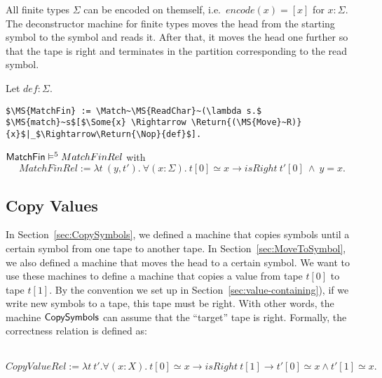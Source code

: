 All finite types $\Sigma$ can be encoded on themself, i.e.\ $encode(x)=[x]$ for $x:\Sigma$.  The deconstructor machine for finite types moves the head
from the starting symbol to the symbol and reads it.  After that, it moves the head one further so that the tape is right and terminates in the
partition corresponding to the read symbol.

\begin{definition}[$\MS{MatchFin}$]
  \label{def:MatchFin}
  Let $def:\Sigma$.
  \small
\begin{lstlisting}[style=semicoqstyle]
$\MS{MatchFin} := \Match~\MS{ReadChar}~(\lambda s.$ $\MS{match}~s$[$\Some{x} \Rightarrow \Return{(\MS{Move}~R)}{x}$|_$\Rightarrow\Return{\Nop}{def}$].
\end{lstlisting}
\end{definition}

\begin{lemma}
  \label{lem:MatchFin_Sem}
  $\mathsf{MatchFin} \mathrel{\vDash^{5}} MatchFinRel$ with
  \[
    MatchFinRel := \lambda t~(y,t').~\forall(x:\Sigma).~t[0] \simeq x \rightarrow isRight~t'[0] ~\land~ y=x.
  \]
\end{lemma}




\subsection{Copy Values}
\label{sec:copy}

In Section~\ref{sec:CopySymbols}, we defined a machine that copies symbols until a certain symbol from one tape to another tape.  In
Section~\ref{sec:MoveToSymbol}, we also defined a machine that moves the head to a certain symbol.  We want to use these machines to define a machine
that copies a value from tape $t[0]$ to tape $t[1]$.  By the convention we set up in Section~\ref{sec:value-containing}), if we write new symbols to a
tape, this tape must be right.  With other words, the machine $\mathsf{CopySymbols}$ can assume that the ``target'' tape is right.  Formally, the
correctness relation is defined as:
\begin{definition}
  \label{def:CopyValue_Rel}
  ~
  \[
    CopyValueRel := \lambda t~t'. \forall (x:X).~t[0] \simeq x \rightarrow isRight~t[1] \rightarrow t'[0] \simeq x \land t'[1] \simeq x.
  \]
\end{definition}

